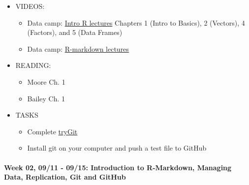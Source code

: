 \documentclass[11pt,]{article}
\providecommand{\tightlist}{%
  \setlength{\itemsep}{0pt}\setlength{\parskip}{0pt}}
\begin{document}
\begin{itemize}
\tightlist
\item
  VIDEOS:

  \begin{itemize}
  \tightlist
  \item
    Data camp:
    \href{https://www.datacamp.com/courses/free-introduction-to-r-beta}{Intro
    R lectures} Chapters 1 (Intro to Basics), 2 (Vectors), 4 (Factors),
    and 5 (Data Frames)
  \item
    Data camp:
    \href{https://www.datacamp.com/courses/reporting-with-r-markdown}{R-markdown
    lectures}
  \end{itemize}
\item
  READING:

  \begin{itemize}
  \tightlist
  \item
    Moore Ch. 1
  \item
    Bailey Ch. 1
  \end{itemize}
\item
  TASKS

  \begin{itemize}
  \tightlist
  \item
    Complete \href{https://try.GitHub.io/levels/1/challenges/1}{tryGit}
  \item
    Install git on your computer and push a test file to GitHub
  \end{itemize}
\end{itemize}

\paragraph{Week 02, 09/11 - 09/15: Introduction to R-Markdown, Managing
Data, Replication, Git and
GitHub}\label{week-02-0911---0915-introduction-to-r-markdown-managing-data-replication-git-and-github}
\end{document}
